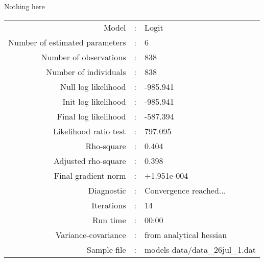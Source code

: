 Nothing here\\


\begin{flushleft}
\begin{tabular}{rcl}
\hline
Model &:& Logit\\
Number of estimated parameters&:&6\\
Number of  observations &:& 838\\
Number of individuals&:&838\\
Null log likelihood&:&-985.941\\
Init log likelihood&:&-985.941\\
Final log likelihood&:&-587.394\\
Likelihood ratio test &:&797.095\\
Rho-square&:&0.404\\
Adjusted rho-square&:&0.398\\
Final gradient norm&:&+1.951e-004\\
Diagnostic&:&Convergence reached...\\
Iterations&:&14\\
Run time&:&00:00\\
Variance-covariance&:&from analytical hessian
\\
Sample file&:&models-data/data_26jul_1.dat\\
\end{tabular}
\end{flushleft}
